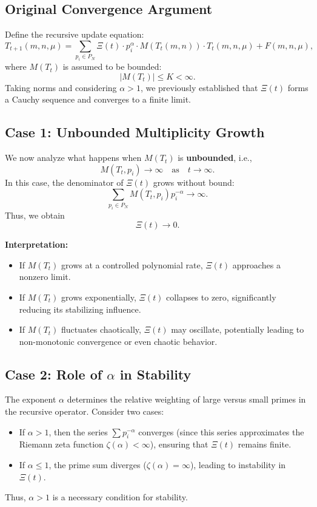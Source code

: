 \documentclass{article}
\theoremstyle{plain}
\begin{document}
\subsection{Original Convergence Argument}
Define the recursive update equation:
\begin{equation}
    T_{t+1}(m,n,\mu) = \sum_{p_i \in P_N} \Xi(t) \cdot p_i^\alpha \cdot M(T_t(m,n)) \cdot T_t(m,n,\mu) + F(m,n,\mu),
\end{equation}
where \( M(T_t) \) is assumed to be bounded:
\begin{equation}
    |M(T_t)| \leq K < \infty.
\end{equation}
Taking norms and considering \( \alpha > 1 \), we previously established that \(\Xi(t) \) forms a Cauchy sequence and converges to a finite limit.

\subsection{Case 1: Unbounded Multiplicity Growth}
We now analyze what happens when \( M(T_t) \) is \textbf{unbounded}, i.e.,
\begin{equation}
    M(T_t, p_i) \to \infty \quad \text{as} \quad t \to \infty.
\end{equation}
In this case, the denominator of \(\Xi(t) \) grows without bound:
\begin{equation}
    \sum_{p_i \in P_N} M(T_t, p_i) p_i^{-\alpha} \to \infty.
\end{equation}
Thus, we obtain
\begin{equation}
    \Xi(t) \to 0.
\end{equation}

\textbf{Interpretation:}
\begin{itemize}
    \item If \( M(T_t) \) grows at a controlled polynomial rate, \(\Xi(t) \) approaches a nonzero limit.
    \item If \( M(T_t) \) grows exponentially, \(\Xi(t) \) collapses to zero, significantly reducing its stabilizing influence.
    \item If \( M(T_t) \) fluctuates chaotically, \(\Xi(t) \) may oscillate, potentially leading to non-monotonic convergence or even chaotic behavior.
\end{itemize}

\subsection{Case 2: Role of \( \alpha \) in Stability}
The exponent \( \alpha \) determines the relative weighting of large versus small primes in the recursive operator. Consider two cases:
\begin{itemize}
    \item If \( \alpha > 1 \), then the series \( \sum p_i^{-\alpha} \) converges (since this series approximates the Riemann zeta function \( \zeta(\alpha) < \infty \)), ensuring that \(\Xi(t) \) remains finite.
    \item If \( \alpha \leq 1 \), the prime sum diverges (\( \zeta(\alpha) = \infty \)), leading to instability in \(\Xi(t) \).
\end{itemize}
Thus, \( \alpha > 1 \) is a necessary condition for stability.
\end{document}
